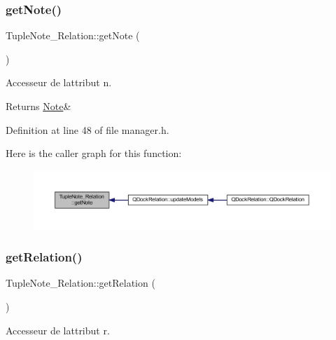 \subsubsection{\texorpdfstring{get\+Note()}{getNote()}}
{\footnotesize\ttfamily Tuple\+Note\+\_\+\+Relation\+::get\+Note (\begin{DoxyParamCaption}{ }\end{DoxyParamCaption})\hspace{0.3cm}{\ttfamily [inline]}}



Accesseur de l\textquotesingle{}attribut n. 

\begin{DoxyReturn}{Returns}
\hyperlink{class_note}{Note}\& 
\end{DoxyReturn}


Definition at line 48 of file manager.\+h.

Here is the caller graph for this function\+:
\nopagebreak
\begin{figure}[H]
\begin{center}
\leavevmode
\includegraphics[width=350pt]{class_tuple_note___relation_a8a3f889d3198a14629e1cabd74985c6d_icgraph}
\end{center}
\end{figure}
\mbox{\label{class_tuple_note___relation_ad326a5fee3d7bec52bda9e0234377d8e}} 
\subsubsection{\texorpdfstring{get\+Relation()}{getRelation()}}
{\footnotesize\ttfamily Tuple\+Note\+\_\+\+Relation\+::get\+Relation (\begin{DoxyParamCaption}{ }\end{DoxyParamCaption})\hspace{0.3cm}{\ttfamily [inline]}}



Accesseur de l\textquotesingle{}attribut r. 

